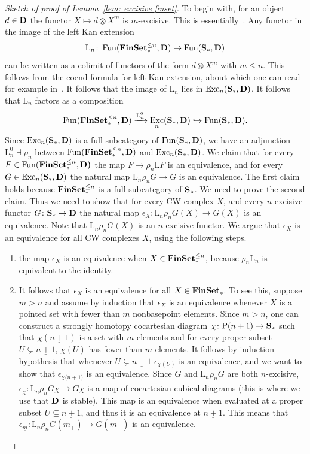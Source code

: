\documentclass[psamsfonts]{amsart}
\theoremstyle{plain}
\theoremstyle{definition}
\theoremstyle{remark}
\newcommand{\catname}[1]{{\normalfont\textbf{#1}}}
\newcommand{\finset}{\catname{FinSet}_*}
\newcommand{\spaces}{\catname{S}_*}
\newcommand{\lkan}{\mathrm{L}}
\newcommand{\power}{\mathrm{P}}
\DeclareMathOperator{\fun}{Fun}
\DeclareMathOperator{\exc}{Exc}
\begin{document}
\begin{proof}[Sketch of proof of Lemma~\ref{lem: excisive finset}]
To begin with, for an object $d\in \catname D$ the functor $X\mapsto d\otimes X^m$ is $m$-excisive. This is essentially~\cite[Example 3.5]{Goodwillie1991}. Any functor in the image of the left Kan extension  
\[
\lkan_n\colon \fun(\finset^{\le n}, \catname{D})\to \fun(\spaces, \catname{D})
\] 
can be written as a colimit of functors of the form $d\otimes X^m$ with $m\le n$. This follows from the coend formula for left Kan extension, about which one can read for example in~\cite{haugseng2021coendsinftycategories}. It follows that the image of $\lkan_n$ lies in $\exc_n(\spaces, \catname{D})$. It follows that $\lkan_n$ factors as a composition
\[
\fun(\finset^{\le n}, \catname{D})\xrightarrow{\lkan_n^0}\exc_n(\spaces, \catname{D})\hookrightarrow \fun(\spaces, \catname{D}).
\]
Since $\exc_n(\spaces, \catname{D})$ is a full subcategory of $\fun(\spaces, \catname{D})$, we have an adjunction $\lkan_n^0\dashv \rho_n$ between $\fun(\finset^{\le n}, \catname{D})$ and $\exc_n(\spaces, \catname{D})$. We claim that for every $F\in \fun(\finset^{\le n}, \catname{D)}$ the map $F\to\rho_n\lkan F$ is an equivalence, and for every $G\in \exc_n(\spaces, \catname{D})$ the natural map $\lkan_n\rho_n G\to G$ is an equivalence. The first claim holds because $\finset^{\le n}$ is a full subcategory of $\spaces$. 
We need to prove the second claim. Thus we need to show that for every CW complex $X$, and every $n$-excisive functor $G\colon \spaces\to \catname{D}$ the natural map $\epsilon_X\colon \lkan_n\rho_nG(X)\to G(X)$ is an equivalence. Note that $\lkan_n\rho_nG(X)$ is an $n$-excisive functor. We argue that $\epsilon_X$ is an equivalence for all CW complexes $X$, using the following steps.
\begin{enumerate}
\item the map $\epsilon_X$ is an equivalence when $X\in \finset^{\le n}$, because $\rho_n\lkan_n$ is equivalent to the identity. 
\item It follows that $\epsilon_X$ is an equivalence for all $X\in \finset$. To see this, suppose $m>n$ and assume by induction that $\epsilon_X$ is an equivalence whenever $X$ is a pointed set with fewer than $m$ nonbasepoint elements. Since $m>n$, one can construct a strongly homotopy cocartesian diagram $\chi\colon\power(n+1)\to \spaces$ such that $\chi(\underline{n+1})$ is a set with $m$ elements and for every proper subset $U\subsetneq\underline{n+1}$, $\chi(U)$ has fewer than $m$ elements. It follows by induction hypothesis that whenever $U\subsetneq\underline{n+1}$ $\epsilon_{\chi(U)}$ is an equivalence, and we want to show that $\epsilon_{\chi(\underline{n+1)}}$ is an equivalence. Since $G$ and $\lkan_n\rho_n G$ are both $n$-excisive, $\epsilon_\chi\colon \lkan_n\rho_n G \chi\to G\chi$ is a map of cocartesian cubical diagrams (this is where we use that $\catname{D}$ is stable). This map is an equivalence when evaluated at a proper subset $U\subsetneq \underline{n+1}$, and thus it is an equivalence at $\underline{n+1}$. This means that  $\epsilon_{\underline{m}}\colon\lkan_n\rho_n G(m_+)\to G(m_+)$ is an equivalence.

\end{enumerate}
\end{proof}
\end{document}
